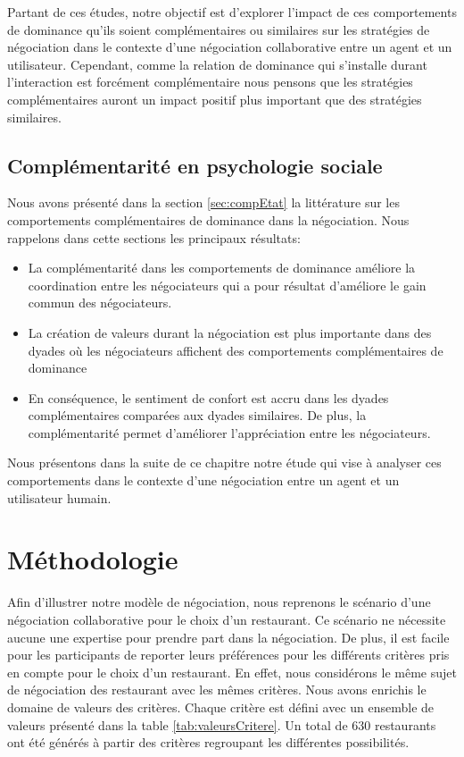 Partant de ces études, notre objectif est d'explorer l'impact de ces comportements de dominance qu'ils soient complémentaires ou similaires sur les stratégies de négociation dans le contexte d'une négociation collaborative entre un agent et un utilisateur. Cependant, comme la relation de dominance qui s'installe durant l'interaction est forcément complémentaire nous pensons que les stratégies complémentaires auront un impact positif plus important que des stratégies similaires.

\subsection{Complémentarité en psychologie sociale}
	Nous avons présenté dans la section \ref{sec:compEtat} la littérature sur les comportements complémentaires de dominance dans la négociation. Nous rappelons dans cette sections les principaux résultats: 
	
	\begin{itemize}
		\item La complémentarité dans les comportements de dominance améliore la coordination entre les négociateurs qui a pour résultat d'améliore le gain commun des négociateurs.
		
		\item La création de valeurs durant la négociation est plus importante dans des dyades où les négociateurs affichent des comportements complémentaires de dominance
		
		\item En conséquence, le sentiment de confort est accru dans les dyades complémentaires comparées aux dyades similaires. De plus, la complémentarité permet d'améliorer l'appréciation entre les négociateurs.
	\end{itemize}
	

Nous présentons dans la suite de ce chapitre notre étude qui vise à analyser ces comportements dans le contexte d'une négociation entre un agent et un utilisateur humain.

\section{Méthodologie}
\label{sec:methodo}

Afin d'illustrer notre modèle de négociation, nous reprenons le scénario d'une négociation collaborative pour le choix d'un restaurant.
Ce scénario ne nécessite aucune une expertise pour prendre part dans la négociation. De plus, il est facile pour les participants de reporter leurs préférences pour les différents critères pris en compte pour le choix d'un restaurant. En effet, nous considérons le même sujet de négociation des restaurant avec les mêmes critères. Nous avons enrichis le domaine de valeurs des critères. Chaque critère est défini avec un ensemble de valeurs présenté dans la table \ref{tab:valeursCritere}. Un total de 630 restaurants ont été générés à partir des critères regroupant les différentes possibilités.


